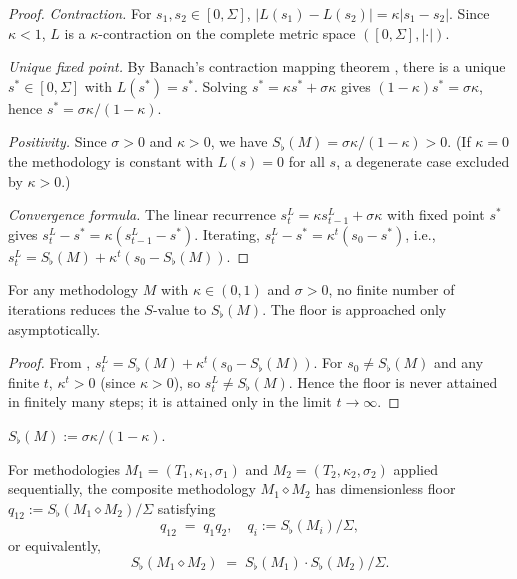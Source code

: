 \documentclass[twocolumn,11pt,a4paper]{article}
\newcommand{\Sfloor}{S_{\flat}}
\newcommand{\abs}[1]{\lvert#1\rvert}
\newcommand{\Compose}{\diamond}
\begin{document}
\begin{proof}
\textit{Contraction.}  For $s_1,s_2\in[0,\Sigma]$,
$\abs{L(s_1)-L(s_2)}=\kappa\abs{s_1-s_2}$.  Since $\kappa<1$, $L$ is a
$\kappa$-contraction on the complete metric space $([0,\Sigma],\abs{\cdot})$.

\textit{Unique fixed point.}  By Banach's contraction mapping theorem
\cite{banach1922}, there is a unique $s^*\in[0,\Sigma]$ with $L(s^*)=s^*$.
Solving $s^*=\kappa s^*+\sigma\kappa$ gives
$(1-\kappa)s^*=\sigma\kappa$, hence $s^*=\sigma\kappa/(1-\kappa)$.

\textit{Positivity.}  Since $\sigma>0$ and $\kappa>0$, we have
$\Sfloor(M)=\sigma\kappa/(1-\kappa)>0$.  (If $\kappa=0$ the methodology
is constant with $L(s)=0$ for all $s$, a degenerate case excluded by
$\kappa>0$.)

\textit{Convergence formula.}  The linear recurrence $s_t^L=\kappa
s_{t-1}^L+\sigma\kappa$ with fixed point $s^*$ gives
$s_t^L-s^*=\kappa(s_{t-1}^L-s^*)$.  Iterating, $s_t^L-s^*=\kappa^t
(s_0-s^*)$, i.e., $s_t^L=\Sfloor(M)+\kappa^t(s_0-\Sfloor(M))$.
\end{proof}

\begin{proposition}
\label{prop:methodirred}
For any methodology $M$ with $\kappa\in(0,1)$ and $\sigma>0$, no finite
number of iterations reduces the $S$-value to $\Sfloor(M)$.  The floor
is approached only asymptotically.
\end{proposition}

\begin{proof}
From , $s_t^L=\Sfloor(M)+\kappa^t(s_0-\Sfloor(M))$.
For $s_0\neq\Sfloor(M)$ and any finite $t$, $\kappa^t>0$ (since
$\kappa>0$), so $s_t^L\neq\Sfloor(M)$.  Hence the floor is never
attained in finitely many steps; it is attained only in the limit
$t\to\infty$.
\end{proof}

\begin{definition}
\label{def:methodfloor}
$\Sfloor(M):=\sigma\kappa/(1-\kappa)$.
\end{definition}

\begin{theorem}
\label{thm:methodcomposition}
For methodologies $M_1=(T_1,\kappa_1,\sigma_1)$ and
$M_2=(T_2,\kappa_2,\sigma_2)$ applied sequentially, the composite
methodology $M_1\Compose M_2$ has dimensionless floor
$q_{12}:=\Sfloor(M_1\Compose M_2)/\Sigma$ satisfying
\[
  q_{12}\;=\;q_1 q_2,
  \quad q_i:=\Sfloor(M_i)/\Sigma,
\]
or equivalently,
\[
  \Sfloor(M_1\Compose M_2)
  \;=\;\Sfloor(M_1)\cdot\Sfloor(M_2)/\Sigma.
\]
\end{theorem}
\end{document}
